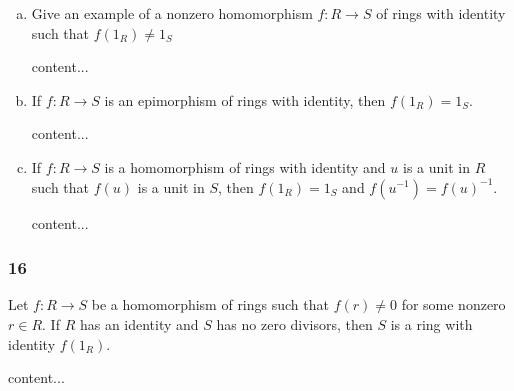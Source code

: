 \begin{enumerate}[(a)]
	\item 
	\begin{graybox}
		Give an example of a nonzero homomorphism $f : R \to S$ of rings with identity such that $f(1_R) \neq 1_S$
	\end{graybox}
	\begin{solution}
		content...
	\end{solution}
	
	\item
	\begin{graybox}
		If $f : R \to S$ is an epimorphism of rings with identity, then $f(1_R) = 1_S$.
	\end{graybox}
	\begin{solution}
		content...
	\end{solution}
	
	\item
	\begin{graybox}
		If $f : R \to S$ is a homomorphism of rings with identity and $u$ is a unit in $R$ such that $f(u)$ is a unit in $S$, then $f(1_R) = 1_S$ and $f(u^{-1}) = f(u)^{-1}$.
	\end{graybox}
	\begin{solution}
		content...
	\end{solution}
\end{enumerate}

\subsubsection*{16}
\begin{graybox}
	Let $f : R \to S$ be a homomorphism of rings such that $f(r) \neq 0$ for some nonzero $r \in R$. If $R$ has an identity and $S$ has no zero divisors, then $S$ is a ring with identity $f(1_R)$.
\end{graybox}
\begin{solution}
	content...
\end{solution}


